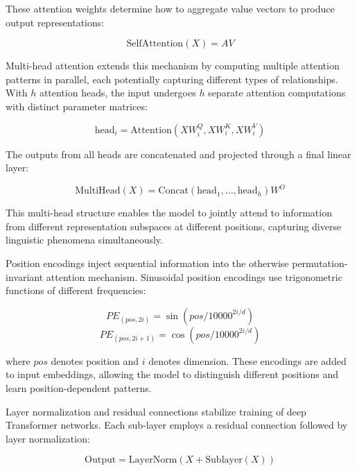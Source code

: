 \documentclass[12pt,a4paper]{report}
\begin{document}
These attention weights determine how to aggregate value vectors to produce output representations:

\begin{equation}
\text{SelfAttention}(X) = AV
\end{equation}

Multi-head attention extends this mechanism by computing multiple attention patterns in parallel, each potentially capturing different types of relationships. With $h$ attention heads, the input undergoes $h$ separate attention computations with distinct parameter matrices:

\begin{equation}
\text{head}_i = \text{Attention}(XW_i^Q, XW_i^K, XW_i^V)
\end{equation}

The outputs from all heads are concatenated and projected through a final linear layer:

\begin{equation}
\text{MultiHead}(X) = \text{Concat}(\text{head}_1, ..., \text{head}_h)W^O
\end{equation}

This multi-head structure enables the model to jointly attend to information from different representation subspaces at different positions, capturing diverse linguistic phenomena simultaneously.

Position encodings inject sequential information into the otherwise permutation-invariant attention mechanism. Sinusoidal position encodings use trigonometric functions of different frequencies:

\begin{equation}
PE_{(pos, 2i)} = \sin(pos / 10000^{2i/d})
\end{equation}
\begin{equation}
PE_{(pos, 2i+1)} = \cos(pos / 10000^{2i/d})
\end{equation}

where $pos$ denotes position and $i$ denotes dimension. These encodings are added to input embeddings, allowing the model to distinguish different positions and learn position-dependent patterns.

Layer normalization and residual connections stabilize training of deep Transformer networks. Each sub-layer employs a residual connection followed by layer normalization:

\begin{equation}
\text{Output} = \text{LayerNorm}(X + \text{Sublayer}(X))
\end{equation}
\end{document}
